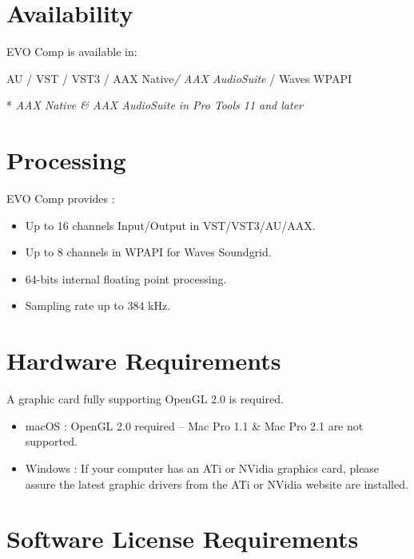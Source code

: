 \documentclass[
  letterpaper,
  DIV=11,
  numbers=noendperiod]{scrreport}
\providecommand{\tightlist}{%
  \setlength{\itemsep}{0pt}\setlength{\parskip}{0pt}}\usepackage{longtable,booktabs,array}
\begin{document}
\hypertarget{availability}{%
\section{Availability}\label{availability}}

EVO Comp is available in:

AU / VST / VST3 / AAX Native\emph{/ AAX AudioSuite} / Waves WPAPI

* \emph{AAX Native \& AAX AudioSuite in Pro Tools 11 and later}

\hypertarget{processing-1}{%
\section{Processing}\label{processing-1}}

EVO Comp provides :

\begin{itemize}
\tightlist
\item
  Up to 16 channels Input/Output in VST/VST3/AU/AAX.
\item
  Up to 8 channels in WPAPI for Waves Soundgrid.
\item
  64-bits internal floating point processing.
\item
  Sampling rate up to 384 kHz.
\end{itemize}

\hypertarget{hardware-requirements}{%
\section{Hardware Requirements}\label{hardware-requirements}}

A graphic card fully supporting OpenGL 2.0 is required.

\begin{itemize}
\tightlist
\item
  macOS : OpenGL 2.0 required -- Mac Pro 1.1 \& Mac Pro 2.1 are not
  supported.
\item
  Windows : If your computer has an ATi or NVidia graphics card, please
  assure the latest graphic drivers from the ATi or NVidia website are
  installed.
\end{itemize}

\hypertarget{software-license-requirements}{%
\section{Software License
Requirements}\label{software-license-requirements}}
\end{document}
